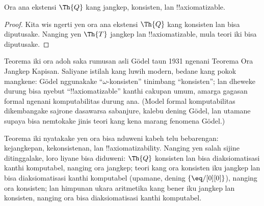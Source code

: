 \documentclass[../../../include/open-logic-section]{subfiles}
\begin{document}


\begin{thm}
Ora ana ekstensi $\Th{Q}$ kang jangkep, konsisten, lan
!!{axiomatizable}.
\end{thm}

\begin{proof}
Kita wis ngerti yen ora ana ekstensi $\Th{Q}$ kang konsisten lan
bisa diputusake. Nanging yen $\Th{T}$ jangkep lan !!{axiomatizable},
mula teori iki bisa diputusake.
\end{proof}

\begin{explain}
Teorema iki ora adoh saka rumusan asli G\"odel taun 1931 ngenani
Teorema Ora Jangkep Kapisan. Saliyane istilah kang luwih modern,
bedane kang pokok mangkene: G\"odel nggunakake
``$\omega$-konsisten'' tinimbang ``konsisten''; lan dheweke durung bisa
nyebut ``!!{axiomatizable}'' kanthi cakupan umum, amarga gagasan formal
ngenani komputabilitas durung ana. (Model formal komputabilitas
dikembangake sajrone dasawarsa sabanjure, kalebu dening G\"odel, lan
utamane supaya bisa nemtokake jinis teori kang kena marang fenomena
G\"odel.)

Teorema iki nyatakake yen ora bisa nduweni kabeh telu bebarengan:
kejangkepan, kekonsistenan, lan !!{axiomatizability}. Nanging yen
salah sijine ditinggalake, loro liyane bisa diduweni: $\Th{Q}$
konsisten lan bisa diaksiomatisasi kanthi komputabel, nanging ora
jangkep; teori kang ora konsisten iku jangkep lan bisa diaksiomatisasi
kanthi komputabel (upamane, dening $\{ \eq/[0][0] \}$), nanging ora
konsisten; lan himpunan ukara aritmetika kang bener iku jangkep lan
konsisten, nanging ora bisa diaksiomatisasi kanthi komputabel.
\end{explain}
\end{document}
